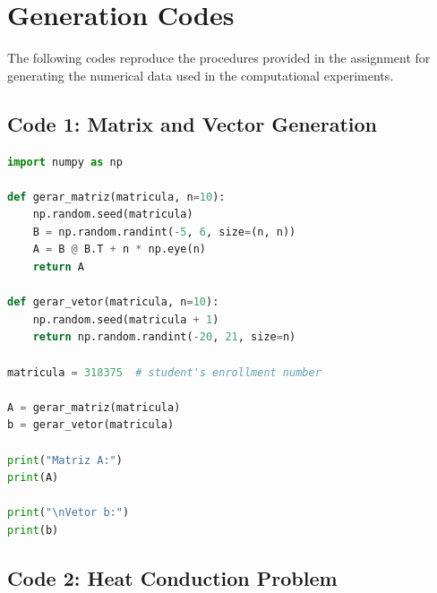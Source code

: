 \appendix

\section{Generation Codes}
\label{app:generation-codes}

The following codes reproduce the procedures provided in the assignment for
generating the numerical data used in the computational experiments.

\lstset{basicstyle=\footnotesize\ttfamily, breaklines=true}

\subsection{Code 1: Matrix and Vector Generation}
\label{app:code1}

\begin{lstlisting}[language=Python, caption={Generation of the matrix $A$ and
vector $b$ using the student's enrollment number.}, label={lst:code1}]
import numpy as np

def gerar_matriz(matricula, n=10):
    np.random.seed(matricula)
    B = np.random.randint(-5, 6, size=(n, n))
    A = B @ B.T + n * np.eye(n)
    return A

def gerar_vetor(matricula, n=10):
    np.random.seed(matricula + 1)
    return np.random.randint(-20, 21, size=n)

matricula = 318375  # student's enrollment number

A = gerar_matriz(matricula)
b = gerar_vetor(matricula)

print("Matriz A:")
print(A)

print("\nVetor b:")
print(b)
\end{lstlisting}

\subsection{Code 2: Heat Conduction Problem}
\label{app:code2}

